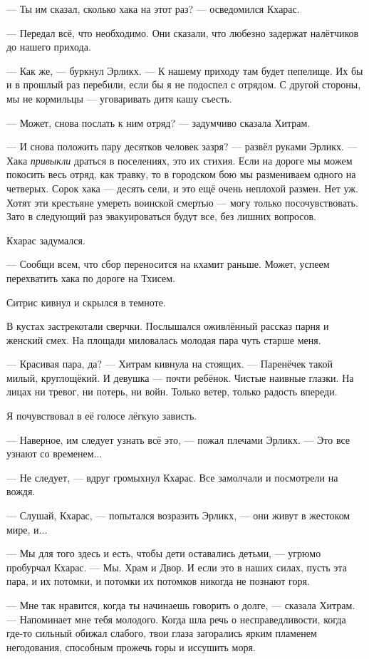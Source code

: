 --- Ты им сказал, сколько хака на этот раз? --- осведомился Кхарас.

--- Передал всё, что необходимо.
Они сказали, что любезно задержат налётчиков до нашего прихода.

--- Как же, --- буркнул Эрликх.
--- К нашему приходу там будет пепелище.
Их бы и в прошлый раз перебили, если бы я не подоспел с отрядом.
С другой стороны, мы не кормильцы --- уговаривать дитя кашу съесть.

--- Может, снова послать к ним отряд? --- задумчиво сказала Хитрам.

--- И снова положить пару десятков человек зазря? --- развёл руками Эрликх.
--- Хака \emph{привыкли} драться в поселениях, это их стихия.
Если на дороге мы можем покосить весь отряд, как травку, то в городском бою мы размениваем одного на четверых.
Сорок хака --- десять сели, и это ещё очень неплохой размен.
Нет уж.
Хотят эти крестьяне умереть воинской смертью --- могу только посочувствовать.
Зато в следующий раз эвакуироваться будут все, без лишних вопросов.

Кхарас задумался.

--- Сообщи всем, что сбор переносится на кхамит раньше.
Может, успеем перехватить хака по дороге на Тхисем.

Ситрис кивнул и скрылся в темноте.

В кустах застрекотали сверчки.
Послышался оживлённый рассказ парня и женский смех.
На площади миловалась молодая пара чуть старше меня.

--- Красивая пара, да? --- Хитрам кивнула на стоящих.
--- Паренёчек такой милый, круглощёкий.
И девушка --- почти ребёнок.
Чистые наивные глазки.
На лицах ни тревог, ни потерь, ни войн.
Только ветер, только радость впереди.

Я почувствовал в её голосе лёгкую зависть.

--- Наверное, им следует узнать всё это, --- пожал плечами Эрликх.
--- Это все узнают со временем...

--- Не следует, --- вдруг громыхнул Кхарас.
Все замолчали и посмотрели на вождя.

--- Слушай, Кхарас, --- попытался возразить Эрликх, --- они живут в жестоком мире, и...

--- Мы для того здесь и есть, чтобы дети оставались детьми, --- угрюмо пробурчал Кхарас.
--- Мы.
Храм и Двор.
И если это в наших силах, пусть эта пара, и их потомки, и потомки их потомков никогда не познают горя.

--- Мне так нравится, когда ты начинаешь говорить о долге, --- сказала Хитрам.
--- Напоминает мне тебя молодого.
Когда шла речь о несправедливости, когда где-то сильный обижал слабого, твои глаза загорались ярким пламенем негодования, способным прожечь горы и иссушить моря.

